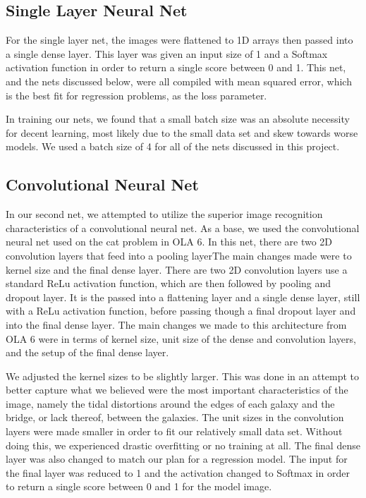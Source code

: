 \documentclass[conference]{IEEEtran}
\begin{document}
\subsection{Single Layer Neural Net}

For the single layer net, the images were flattened to 1D arrays then passed into a single dense layer. This layer was given an input size of 1 and a Softmax activation function in order to return a single score between 0 and 1. This net, and the nets discussed below, were all compiled with mean squared error, which is the best fit for regression problems, as the loss parameter.

In training our nets, we found that a small batch size was an absolute necessity for decent learning, most likely due to the small data set and skew towards worse models. We used a batch size of 4 for all of the nets discussed in this project.

\subsection{Convolutional Neural Net}

In our second net, we attempted to utilize the superior image recognition characteristics of a convolutional neural net. As a base, we used the convolutional neural net used on the cat problem in OLA 6. In this net, there are two 2D convolution layers that feed into a pooling layerThe main changes made were to kernel size and the final dense layer. There are two 2D convolution layers use a standard ReLu activation function, which are then followed by pooling and dropout layer. It is the passed into a flattening layer and a single dense layer, still with a ReLu activation function, before passing though a final dropout layer and into the final dense layer. The main changes we made to this architecture from OLA 6 were in terms of kernel size, unit size of the dense and convolution layers, and the setup of the final dense layer. 

We adjusted the kernel sizes to be slightly larger. This was done in an attempt to better capture what we believed were the most important characteristics of the image, namely the tidal distortions around the edges of each galaxy and the bridge, or lack thereof, between the galaxies. The unit sizes in the convolution layers were made smaller in order to fit our relatively small data set. Without doing this, we experienced drastic overfitting or no training at all. The final dense layer was also changed to match our plan for a regression model. The input for the final layer was reduced to 1 and the activation changed to Softmax in order to return a single score between 0 and 1 for the model image.
\end{document}
